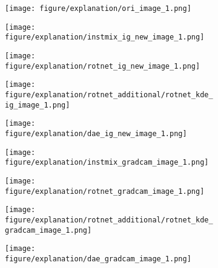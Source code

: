 \documentclass{article} \usepackage{iclr2021_conference,times}
\begin{document}
\begin{figure}[h!]
\centering
\begin{subfigure}{.11\textwidth}
  \centering
  \texttt{[image: figure/explanation/ori\_image\_1.png]}
\end{subfigure}
\hspace{-2mm}
\begin{subfigure}{.11\textwidth}
  \centering
  \texttt{[image: figure/explanation/instmix\_ig\_new\_image\_1.png]}
\end{subfigure}
\hspace{-2mm}
\begin{subfigure}{.11\textwidth}
  \centering
  \texttt{[image: figure/explanation/rotnet\_ig\_new\_image\_1.png]}
\end{subfigure}
\hspace{-2mm}
\begin{subfigure}{.11\textwidth}
  \centering
  \texttt{[image: figure/explanation/rotnet\_additional/rotnet\_kde\_ig\_image\_1.png]}
\end{subfigure}
\hspace{-2mm}
\begin{subfigure}{.11\textwidth}
  \centering
  \texttt{[image: figure/explanation/dae\_ig\_new\_image\_1.png]}
\end{subfigure}
\hspace{-2mm}
\begin{subfigure}{.11\textwidth}
  \centering
  \texttt{[image: figure/explanation/instmix\_gradcam\_image\_1.png]}
\end{subfigure}
\hspace{-2mm}
\begin{subfigure}{.11\textwidth}
  \centering
  \texttt{[image: figure/explanation/rotnet\_gradcam\_image\_1.png]}
\end{subfigure}
\hspace{-2mm}
\begin{subfigure}{.11\textwidth}
  \centering
  \texttt{[image: figure/explanation/rotnet\_additional/rotnet\_kde\_gradcam\_image\_1.png]}
\end{subfigure}
\hspace{-2mm}
\begin{subfigure}{.11\textwidth}
  \centering
  \texttt{[image: figure/explanation/dae\_gradcam\_image\_1.png]}
\end{subfigure}\\
\begin{subfigure}{.11\textwidth}

\end{subfigure}
\end{figure}
\end{document}
